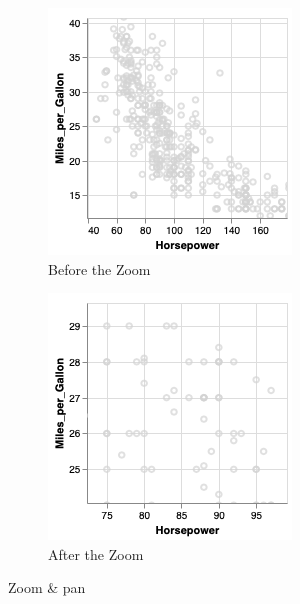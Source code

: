 \begin{figure}[H]
\begin{subfigure}{.45\textwidth}
  \centering
  \captionsetup{justification=centering}
  \includegraphics[width=.8\linewidth]{./pics/zoom1}  
  \caption{Before the Zoom}
  \label{fig:sub-first-z}
\end{subfigure}
\begin{subfigure}{.45\textwidth}
  \centering
  \captionsetup{justification=centering}
  \includegraphics[width=.8\linewidth]{./pics/zoom2}   
  \caption{After the Zoom}
  \label{fig:sub-second-z}
\end{subfigure}
\captionsetup{justification=centering}
\caption{Zoom \& pan \cite{zoompan} }
\label{fig:zoomANDpan}
\end{figure}

